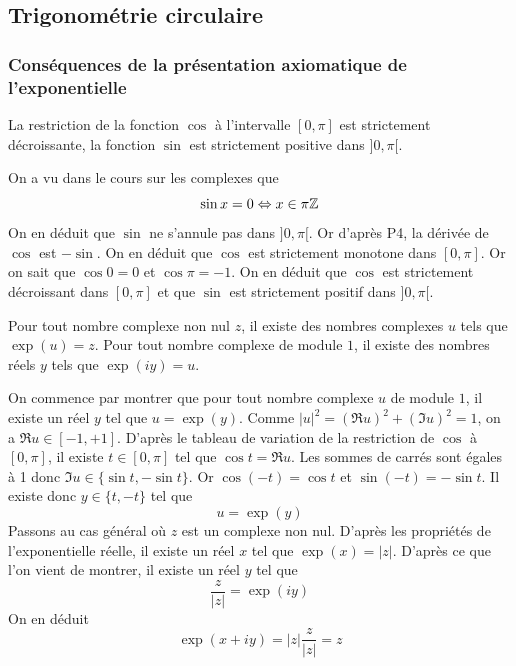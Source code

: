 \subsection{Trigonométrie circulaire}

\subsubsection{Conséquences de la présentation axiomatique de l'exponentielle}
\begin{prop}
 La restriction de la fonction $\cos$ à l'intervalle $[0,\pi]$ est strictement décroissante, la fonction $\sin$ est strictement positive dans $]0,\pi[$.
\end{prop}
\begin{demo}
 On a vu dans le cours sur les complexes que 
\begin{displaymath}
 \sin x= 0 \Leftrightarrow x\in \pi \mathbb{Z}
\end{displaymath}
On en déduit que $\sin$ ne s'annule pas dans $]0,\pi[$. Or d'après P4, la dérivée de $\cos$ est $-\sin$. On en déduit que $\cos$ est strictement monotone dans $[0,\pi]$. Or on sait que $\cos 0=0$ et $\cos \pi =-1$. On en déduit que $\cos$ est strictement décroissant dans $[0,\pi]$ et que $\sin$ est strictement positif dans $]0,\pi[$.
\end{demo}

\begin{prop}
Pour tout nombre complexe non nul $z$, il existe des nombres complexes $u$ tels que $\exp(u)=z$.\newline
Pour tout nombre complexe de module $1$, il existe des nombres réels $y$ tels que $\exp(iy)=u$.
\end{prop}
\begin{demo}
On commence par montrer que pour tout nombre complexe $u$ de module $1$, il existe un réel $y$ tel que $u=\exp(y)$.\newline
Comme $|u|^2=(\Re u)^2+(\Im u)^2=1$, on a $\Re u\in [-1,+1]$. D'après le tableau de variation de la restriction de $\cos$ à $[0,\pi]$, il existe $t\in[0,\pi]$ tel que $\cos t = \Re u$. Les sommes de carrés sont égales à 1 donc
$\Im u \in \{\sin t , -\sin t\}$. Or $\cos(-t)=\cos t$ et $\sin (-t)=-\sin t$. Il existe donc $y\in\{t, -t\}$ tel que
\begin{displaymath}
 u=\exp(y)
\end{displaymath}
Passons au cas général où $z$ est un complexe non nul. D'après les propriétés de l'exponentielle réelle, il existe un réel $x$ tel que $\exp(x)=|z|$. D'après ce que l'on vient de montrer, il existe un réel $y$ tel que
\begin{displaymath}
 \dfrac{z}{|z|}=\exp(iy)
\end{displaymath}
On en déduit
\begin{displaymath}
 \exp(x+iy)=|z|\dfrac{z}{|z|}=z
\end{displaymath}
\end{demo}

